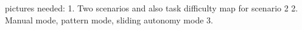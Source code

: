 \documentclass[journal]{IEEEtran}
\begin{document}





pictures needed:
1. Two scenarios and also task difficulty map for scenario 2
2. Manual mode, pattern mode, sliding autonomy mode
3. 



\end{document}
